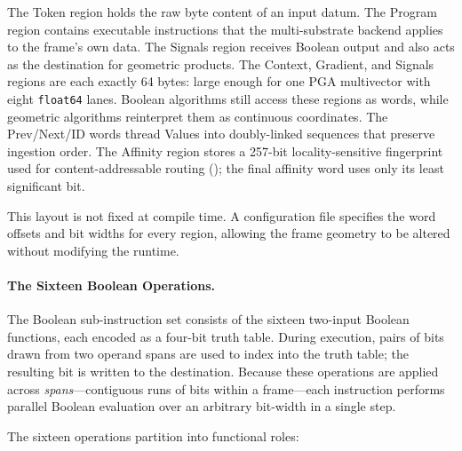 The Token region holds the raw byte content of an input datum.  The
Program region contains executable instructions that the multi-substrate
backend applies to the frame's own data.  The Signals region receives
Boolean output and also acts as the destination for geometric products.
The Context, Gradient, and Signals regions are each exactly 64 bytes:
large enough for one PGA multivector with eight \texttt{float64} lanes.
Boolean algorithms still access these regions as words, while geometric
algorithms reinterpret them as continuous coordinates.  The
Prev/Next/ID words thread Values into doubly-linked sequences that
preserve ingestion order.  The Affinity region stores a 257-bit
locality-sensitive fingerprint used for content-addressable routing
(); the final affinity word uses only its
least significant bit.

This layout is not fixed at compile time.  A configuration file specifies
the word offsets and bit widths for every region, allowing the frame
geometry to be altered without modifying the runtime.

\paragraph{The Sixteen Boolean Operations.}
The Boolean sub-instruction set consists of the sixteen two-input Boolean
functions, each encoded as a four-bit truth table.  During execution,
pairs of bits drawn from two operand spans are used to index into the
truth table; the resulting bit is written to the destination.  Because
these operations are applied across \emph{spans}---contiguous runs of
bits within a frame---each instruction performs parallel Boolean
evaluation over an arbitrary bit-width in a single step.

The sixteen operations partition into functional roles:

